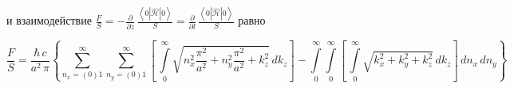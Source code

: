 \documentclass[twoside, 10pt]{article}
\begin{document}
и взаимодействие
\(\frac{F}{S} = -\frac{\partial }{\partial z} \,\frac{\left<0|\hat{\mathcal{H}}|0\right>}{S} = \frac{\partial}{\partial l} \,\frac{\left<0|\hat{\mathcal{H}}|0\right>}{S}\) равно


\noindent
\begin{equation}\frac{F}{S} = \frac{\hbar\,c}{a^2\,\pi}\left\{\sum\limits_{n_x=(0)1}^{\infty}\sum\limits_{n_y=(0)1}^{\infty}\left[\,\int\limits_{0}^{\infty}\sqrt{n_x^2\frac{\pi^2}{a^2}+n_y^2\frac{\pi^2}{a^2}+k_z^2}\,dk_z\right] -
\int\limits_{0}^{\infty}\int\limits_{0}^{\infty}\left[\,\int\limits_{0}^{\infty}\sqrt{k_x^2+k_y^2+k_z^2}\,dk_z\right]\,dn_x\,dn_y\right\}\end{equation}
\end{document}
